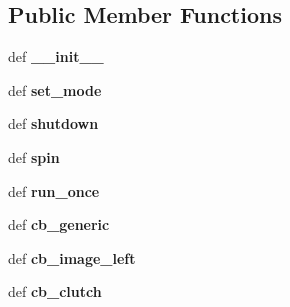 \subsection*{Public Member Functions}
\begin{DoxyCompactItemize}
\item 
\hypertarget{classcamera__control__node_1_1bag__writer_a2fd10ac169a7d20a0465de51060db15f}{def {\bfseries \-\_\-\-\_\-init\-\_\-\-\_\-}}\label{classcamera__control__node_1_1bag__writer_a2fd10ac169a7d20a0465de51060db15f}

\item 
\hypertarget{classcamera__control__node_1_1bag__writer_aec30ac809f29fe84bcd9f437a6f7f8b6}{def {\bfseries set\-\_\-mode}}\label{classcamera__control__node_1_1bag__writer_aec30ac809f29fe84bcd9f437a6f7f8b6}

\item 
\hypertarget{classcamera__control__node_1_1bag__writer_a2f93b13f40300524275c74fb507461ea}{def {\bfseries shutdown}}\label{classcamera__control__node_1_1bag__writer_a2f93b13f40300524275c74fb507461ea}

\item 
\hypertarget{classcamera__control__node_1_1bag__writer_a75c3ee386816904bd1c2de6e6cc34d15}{def {\bfseries spin}}\label{classcamera__control__node_1_1bag__writer_a75c3ee386816904bd1c2de6e6cc34d15}

\item 
\hypertarget{classcamera__control__node_1_1bag__writer_a292bd2453b046820e45775be76316ddc}{def {\bfseries run\-\_\-once}}\label{classcamera__control__node_1_1bag__writer_a292bd2453b046820e45775be76316ddc}

\item 
\hypertarget{classcamera__control__node_1_1bag__writer_a69162516ac1a3b993aaf7dbc2e8a2a81}{def {\bfseries cb\-\_\-generic}}\label{classcamera__control__node_1_1bag__writer_a69162516ac1a3b993aaf7dbc2e8a2a81}

\item 
\hypertarget{classcamera__control__node_1_1bag__writer_a793e667e36d72fef99cabd96a3355e2b}{def {\bfseries cb\-\_\-image\-\_\-left}}\label{classcamera__control__node_1_1bag__writer_a793e667e36d72fef99cabd96a3355e2b}

\item 
\hypertarget{classcamera__control__node_1_1bag__writer_aa7743b12d72131eda4b99324040ac518}{def {\bfseries cb\-\_\-clutch}}\label{classcamera__control__node_1_1bag__writer_aa7743b12d72131eda4b99324040ac518}


\end{DoxyCompactItemize}
